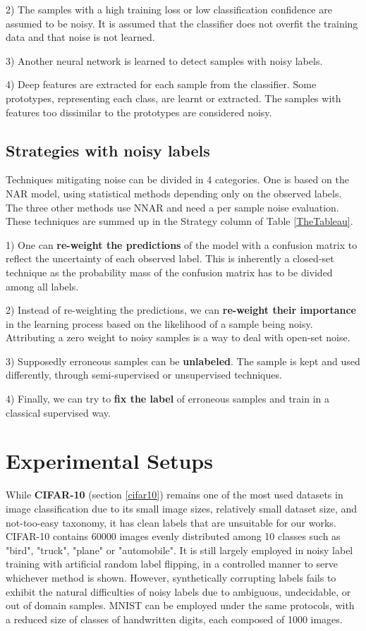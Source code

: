 2) The samples with a high training loss or low classification confidence are assumed to be noisy. It is assumed that the classifier does not overfit the training data and that noise is not learned.

3) Another neural network is learned to detect samples with noisy labels.

4) Deep features are extracted for each sample from the classifier. Some prototypes, representing each class, are learnt or extracted. The samples with features too dissimilar to the prototypes are considered noisy.

\subsection{Strategies with noisy labels}
\label{strategies}

Techniques mitigating noise can be divided in 4 categories. One is based on the NAR model, using statistical methods depending only on the observed labels. The three other methods use NNAR and need a per sample noise evaluation. These techniques are summed up in the Strategy column of Table \ref{TheTableau}.

1) One can \textbf{re-weight the predictions} of the model with a confusion matrix to reflect the uncertainty of each observed label. This is inherently a closed-set technique as the probability mass of the confusion matrix has to be divided among all labels.

2) Instead of re-weighting the predictions, we can \textbf{re-weight their importance} in the learning process based on the likelihood of a sample being noisy. Attributing a zero weight to noisy samples is a way to deal with open-set noise.

3) Supposedly erroneous samples can be \textbf{unlabeled}. The sample is kept and used differently, through semi-supervised or unsupervised techniques.

4) Finally, we can try to \textbf{fix the label} of erroneous samples and train in a classical supervised way.

\section{Experimental Setups}

While \textbf{CIFAR-10} \citep{cifar10} (section \ref{cifar10}) remains one of the most used datasets in image classification due to its small image sizes, relatively small dataset size, and not-too-easy taxonomy, it has clean labels that are unsuitable for our works. CIFAR-10 contains 60000 images evenly distributed among 10 classes such as "bird", "truck", "plane" or "automobile". It is still largely employed in noisy label training with artificial random label flipping, in a controlled manner to serve whichever method is shown. However, synthetically corrupting labels fails to exhibit the natural difficulties of noisy labels due to ambiguous, undecidable, or out of domain samples. MNIST \citep{mnist} can be employed under the same protocols, with a reduced size of classes of handwritten digits, each composed of 1000 images.

